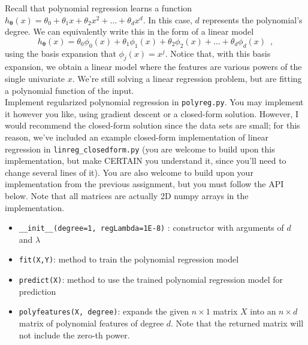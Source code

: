 Recall that polynomial regression learns a function $h_{\bm{\theta}}(x) = \theta_0 + \theta_1 x + \theta_2 x^2 + \ldots + \theta_d x^d$.  In this case, $d$ represents the polynomial's degree.  We can equivalently write this in the form of a  linear model
\begin{equation}
h_{\bm{\theta}}(x) = \theta_0 \phi_0(x) + \theta_1 \phi_1(x)  + \theta_2 \phi_2(x)  + \ldots + \theta_d \phi_d(x)  \enspace ,
\end{equation}
using the basis expansion that $\phi_j(x) = x^j$.  Notice that, with this basis expansion, we obtain a linear model where the features are various powers of the single univariate $x$.  We're still solving a linear regression problem, but are fitting a polynomial function of the input.\\

 Implement regularized polynomial regression in \texttt{polyreg.py}.  You may implement it however you like, using gradient descent or a closed-form solution.  However, I would recommend the closed-form solution since the data sets are small; for this reason, we've included an example closed-form implementation of linear regression in \texttt{linreg\_closedform.py} (you are welcome to build upon this implementation, but make CERTAIN you understand it, since you'll need to change several lines of it).  You are also welcome to build upon your implementation from the previous assignment, but you must follow the API below.  Note that all matrices are actually 2D numpy arrays in the implementation.\\

\begin{itemize}[noitemsep, nolistsep]
    \item \texttt{\_\_init\_\_(degree=1, regLambda=1E-8)} : constructor with arguments of $d$ and $\lambda$
    \item \texttt{fit(X,Y)}: method to train the polynomial regression model
    \item \texttt{predict(X)}: method to use the trained polynomial regression model for prediction
    \item \texttt{polyfeatures(X, degree)}: expands the given $n \times 1$ matrix $X$ into an $n \times d$ matrix of polynomial features of degree $d$.  Note that the returned matrix will not include the zero-th power.
\end{itemize}

